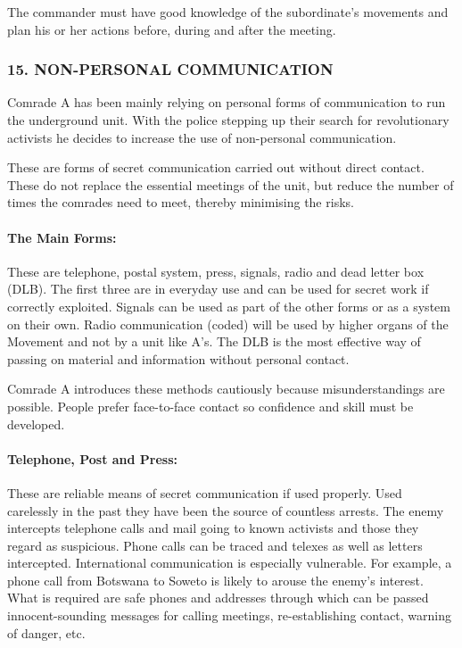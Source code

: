 The commander must have good knowledge of the subordinate's movements
and plan his or her actions before, during and after the meeting.

\subsubsection{15. NON-PERSONAL COMMUNICATION}

Comrade A has been mainly relying on personal forms of communication to
run the underground unit. With the police stepping up their search for
revolutionary activists he decides to increase the use of non-personal
communication.

These are forms of secret communication carried out without direct
contact. These do not replace the essential meetings of the unit, but
reduce the number of times the comrades need to meet, thereby minimising
the risks.

\paragraph{The Main Forms:}

These are telephone, postal system, press, signals, radio and dead
letter box (DLB). The first three are in everyday use and can be used
for secret work if correctly exploited. Signals can be used as part of
the other forms or as a system on their own. Radio communication (coded)
will be used by higher organs of the Movement and not by a unit like
A's. The DLB is the most effective way of passing on material and
information without personal contact.

Comrade A introduces these methods cautiously because misunderstandings
are possible. People prefer face-to-face contact so confidence and skill
must be developed.

\paragraph{Telephone, Post and Press:}

These are reliable means of secret communication if used properly. Used
carelessly in the past they have been the source of countless arrests.
The enemy intercepts telephone calls and mail going to known activists
and those they regard as suspicious. Phone calls can be traced and
telexes as well as letters intercepted. International communication is
especially vulnerable. For example, a phone call from Botswana to Soweto
is likely to arouse the enemy's interest. What is required are safe
phones and addresses through which can be passed innocent-sounding
messages for calling meetings, re-establishing contact, warning of
danger, etc.

